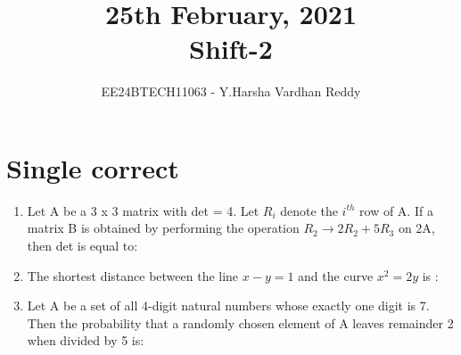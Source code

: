 \documentclass[journal,,12pt,onecolumn]{IEEEtran}
\theoremstyle{remark}
\begin{document}

\vspace{3cm}

\title{25th February, 2021\\Shift-2}
\author{EE24BTECH11063 - Y.Harsha Vardhan Reddy}
\maketitle

\bigskip

\renewcommand{\thefigure}{\theenumi}
\renewcommand{\thetable}{\theenumi}

\section*{Single correct}
\begin{enumerate}
    \item Let A be a 3 x 3 matrix with det = 4. Let $R_i$ denote the $i^{th}$ row of A. If a matrix B is obtained by performing the operation $R_2 \rightarrow 2R_2 + 5R_3$ on 2A, then det is equal to: 
    \begin{enumerate}
        \end{enumerate}
        \item The shortest distance between the line $x-y=1$ and the curve $x^2=2y$ is :
        \begin{enumerate}
        \end{enumerate}
\item Let A be a set of all 4-digit natural numbers whose exactly one digit is 7. Then the probability that a randomly chosen element of A leaves remainder 2 when divided by 5 is:
        \begin{enumerate}
        \begin{multicols}{4}

\end{multicols}
\end{enumerate}
\end{enumerate}
\end{document}
